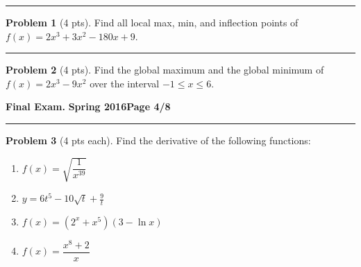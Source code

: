 \documentclass[12pt]{article}
\theoremstyle{definition}
\newtheorem{problem}{Problem}
\begin{document}
\hrule
\begin{problem}[4 pts]
Find all local max, min, and inflection points of $f(x) = 2x^3 + 3x^2-180x+9$.
\end{problem}
\vspace{6cm}
\hrule
\begin{problem}[4 pts]
Find the global maximum and the global minimum of $f(x) = 2x^3 - 9x^2$ over the interval $-1 \leq x \leq 6$.
\end{problem}

\newpage

\hfill{\large\bf Final Exam.}\hfill{\large\bf
  Spring 2016}\hfill{\large\bf Page 4/8}\hrule

\bigskip

\bigskip
\begin{problem}[4 pts each]
Find the derivative of the following functions:
\begin{enumerate}
\item $f(x) = \sqrt{\dfrac{1}{x^{39}}}$
\begin{flushright}
\end{flushright}
\item $y = 6t^5 - 10\sqrt{t} + \frac{9}{t}$
\begin{flushright}
\end{flushright}
\item $f(x) = (2^x + x^5)(3 - \ln x)$
\begin{flushright}
\end{flushright}
\item $f(x) = \dfrac{x^8+2}{x}$
\begin{flushright}
\end{flushright}

\end{enumerate}
\end{problem}
\end{document}
